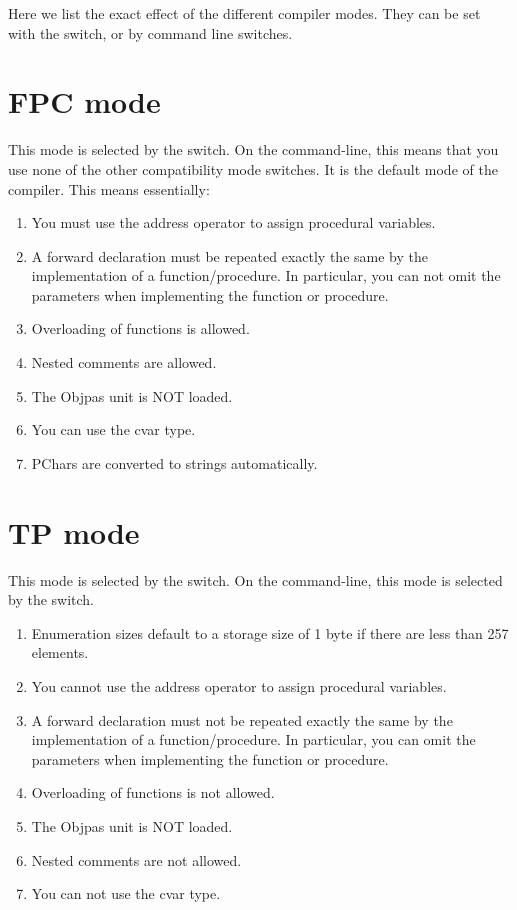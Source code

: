 {Here we list the exact effect of the different compiler modes. They can be
set with the  switch, or by command line switches.

\section{FPC mode}
This mode is selected by the  switch. On the command-line,
this means that you use none of the other compatibility mode switches.
It is the default mode of the compiler. This means essentially:
\begin{enumerate}
\item You must use the address operator to assign procedural variables.
\item A forward declaration must be repeated exactly the same by the
implementation of a function/procedure. In particular, you can not omit the
parameters when implementing the function or procedure.
\item Overloading of functions is allowed.
\item Nested comments are allowed.
\item The Objpas unit is NOT loaded.
\item You can use the cvar type.
\item PChars are converted to strings automatically.
\end{enumerate}
\section{TP mode}
This mode is selected by the  switch. On the command-line,
this mode is selected by the  switch.

\begin{enumerate}
\item Enumeration sizes default to a storage size of 1 byte if there
are less than 257 elements.
\item You cannot use the address operator to assign procedural variables.
\item A forward declaration must not be repeated exactly the same by the
implementation of a function/procedure. In particular, you can omit the
parameters when implementing the function or procedure.
\item Overloading of functions is not allowed.
\item The Objpas unit is NOT loaded.
\item Nested comments are not allowed.
\item You can not use the cvar type.
\end{enumerate}
}
